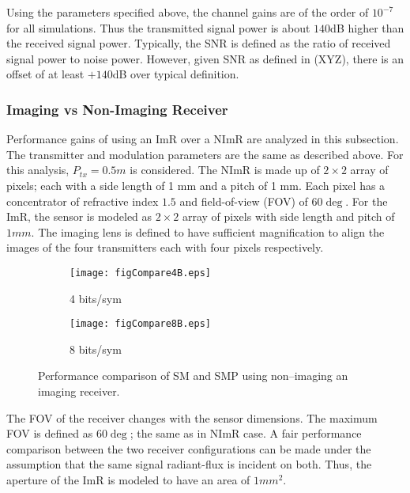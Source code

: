 Using the parameters specified above, the channel gains are of the order of $10^{-7}$ for all simulations. Thus the transmitted signal power is about $140$dB higher than the received signal power. Typically, the SNR is defined as the ratio of received signal power to noise power. However, given SNR as defined in {\color{red}(XYZ)}, there is an offset of at least $+140$dB over typical definition.

\subsubsection{Imaging vs Non-Imaging Receiver}
\label{subsubsec:osmResultsCompare}
Performance gains of using an ImR over a NImR are analyzed in this subsection. The transmitter and modulation parameters are the same as described above. For this analysis, $P_{tx}=0.5m$ is considered. The NImR is made up of $2\times2$ array of pixels; each with a side length of 1 mm and a pitch of 1 mm. Each pixel has a concentrator of refractive index $1.5$ and field-of-view (FOV) of $60\deg$. For the ImR, the sensor is modeled as $2\times2$ array of pixels with side length and pitch of $1mm$. The imaging lens is defined to have sufficient magnification to align the images of the four transmitters each with four pixels respectively. 
\begin{figure}[!b]
	\centering
		\begin{subfigure}{\textwidth}
			\texttt{[image: figCompare4B.eps]}
			\caption{4 bits/sym}
			\label{figCompare4B}
		\end{subfigure}
	
		\begin{subfigure}{\textwidth}
		\texttt{[image: figCompare8B.eps]}
		\caption{8 bits/sym}
		\label{figCompare8B}
		\end{subfigure}
	
	\caption{Performance comparison of SM and SMP using non--imaging an imaging receiver.}
	\label{figCompare}
\end{figure}
The FOV of the receiver changes with the sensor dimensions. The maximum FOV is defined as $60\deg$; the same as in NImR case. A fair performance comparison between the two receiver configurations can be made under the assumption that the same signal radiant-flux is incident on both. Thus, the aperture of the ImR is modeled to have an area of $1mm^{2}$.

